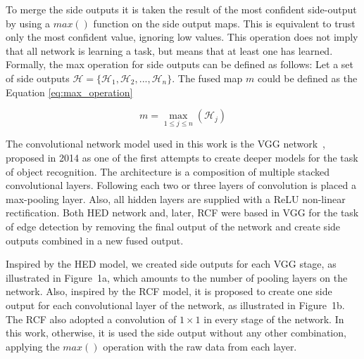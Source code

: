 To merge the side outputs it is taken the result of the most confident side-output by using a $max()$ function on the side output maps. This is equivalent to trust only the most confident value, ignoring low values. This operation does not imply that all network is learning a task, but means that at least one has learned. Formally, the max operation for side outputs can be defined as follows: Let a set of side outputs $\mathcal{H} = \{\mathcal{H}_1,\mathcal{H}_2,..., \mathcal{H}_n\}$. The fused map $m$ could be defined as the Equation \ref{eq:max_operation}

\begin{equation}
m = \max_{1 \leq j \leq n} (\mathcal{H}_j)
\label{eq:max_operation}
\end{equation}

The convolutional network model used in this work is the VGG network~\cite{simonyan2014}, proposed in 2014 as one of the first attempts to create deeper models for the task of object recognition. The architecture is a composition of multiple stacked convolutional layers. Following each two or three layers of convolution is placed a max-pooling layer. Also, all hidden layers are supplied with a ReLU non-linear rectification. Both HED network \cite{xie2017} and, later, RCF \cite{liu2017} were based in VGG for the task of edge detection by removing the final output of the network and create side outputs combined in a new fused output. 

Inspired by the HED model, we created side outputs for each VGG stage, as illustrated in Figure~1a, which amounts to the number of pooling layers on the network. Also, inspired by the RCF model, it is proposed to create one side output for each convolutional layer of the network, as illustrated in Figure~1b. The RCF also adopted a convolution of $1\times1$ in every stage of the network. In this work, otherwise, it is used the side output without any other combination, applying the $max()$ operation with the raw data from each layer.    




